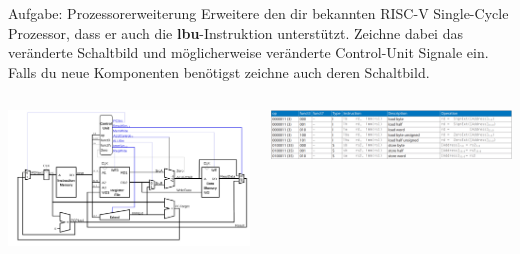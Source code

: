 \documentclass[
  german,            %
  aspectratio=169,    %
]{tumbeamer}
\begin{document}
\begin{frame}[c]{Aufgabe: Prozessorerweiterung}{}
	Erweitere den dir bekannten RISC-V Single-Cycle Prozessor, dass er auch die \textbf{lbu}-Instruktion unterstützt. Zeichne dabei das veränderte Schaltbild und möglicherweise veränderte Control-Unit Signale ein. Falls du neue Komponenten benötigst zeichne auch deren Schaltbild.
	\vspace{0.5cm}
	\begin{columns}[c]
		\begin{column}{0.5\textwidth}
			\includegraphics[width=1.0\textwidth]{w06_singlecycleriscv_lv.png}
		\end{column}
		\begin{column}{0.5\textwidth}
			\begin{center}
				\includegraphics[width=1.0\textwidth]{w03_loadbefehle.png}
			\end{center}
		\end{column}
	\end{columns}
\end{frame}
\end{document}
